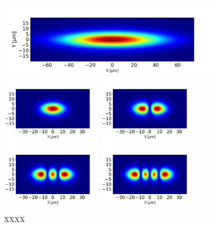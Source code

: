 \documentclass{iucr}              %
\begin{document}
\begin{figure}
    \centering
        \includegraphics[width=\textwidth]{GRAPHICS/ebs_spectral_density.png}
        \includegraphics[width=0.45\textwidth]{GRAPHICS/ebs_mode0.png}
        \includegraphics[width=0.45\textwidth]{GRAPHICS/ebs_mode1.png}
        \includegraphics[width=0.45\textwidth]{GRAPHICS/ebs_mode2.png}
        \includegraphics[width=0.45\textwidth]{GRAPHICS/ebs_mode3.png}
    \label{spectraldensity}
    \caption{XXXX }
\end{figure}
\end{document}
